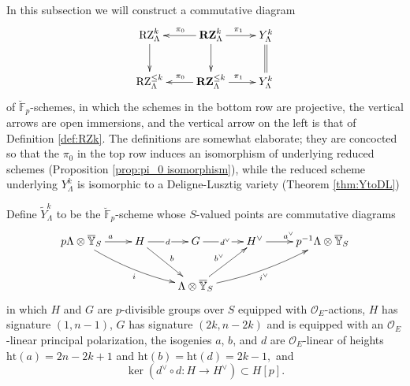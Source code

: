 \documentclass[11pt]{alggeom}
\newcommand{\F}{\mathbb F}
\newcommand{\co}{\mathcal O}
\begin{document}


In this subsection  we  will construct a commutative diagram 
\begin{equation}\label{augment diagram}
\xymatrix{
{ \mathrm{RZ}^ k_\Lambda }    \ar[d] & { \mathbf{RZ}^k_\Lambda } \ar[d]  \ar[l]_{\pi_0} \ar[r]^{\pi_1}   &  {  Y^k_\Lambda }  \ar@{=}[d] \\
{ \mathrm{RZ}^{\le k}_\Lambda }    & { \mathbf{RZ}^{\le k}_\Lambda } \ar[l]_{\pi_0} \ar[r]^{\pi_1}   &  {  Y^k_\Lambda } 
}
\end{equation}
of  $\breve{\F}_p$-schemes, in which the schemes in the bottom row are projective,  the vertical arrows are open immersions, and the vertical arrow on the left is that of Definition \ref{def:RZk}.
The definitions are somewhat elaborate;   they are concocted so that  the $\pi_0$ in the top row induces an isomorphism of underlying reduced schemes (Proposition \ref{prop:pi_0 isomorphism}),  while the reduced scheme underlying $Y_\Lambda^k$ is isomorphic to a Deligne-Lusztig variety (Theorem \ref{thm:YtoDL})





Define $\widetilde{Y}_\Lambda^{k}$ to be the $\breve{\F}_p$-scheme whose $S$-valued points are  commutative diagrams
\begin{equation}\label{Y tilde functor}
\xymatrix{
{p\Lambda \otimes \overline{\mathbb{Y}}_S  }\ar[r]^a    \ar@/_/[drr]_i  &  { H }  \ar[dr]^b  \ar[r]|{\, d\, }  &  {G}  \ar[r] | {\, d^\vee\, } & {H^\vee}  \ar[r]^{a^\vee}  & {p^{-1}\Lambda \otimes  \overline{\mathbb{Y}}_S  } \\
& &  { \Lambda \otimes  \overline{\mathbb{Y} }_S } \ar[ur]^{b^\vee} \ar@/_/[urr]_{i^\vee}
}
\end{equation}
in which $H$ and $G$ are $p$-divisible groups  over $S$  equipped  with  $\co_E$-actions, 
$H$ has  signature $(1,n-1)$, $G$ has signature $(2k, n-2k)$ and is equipped with an $\co_E$-linear principal polarization, 
the  isogenies   $a$, $b$, and $d$  are $\co_E$-linear  of heights  $\mathrm{ht}(a)=2n-2k+1$ and 
$
\mathrm{ht}(b) = \mathrm{ht}(d) =2k-1,
$
and 
\begin{equation}\label{Hpol}
\ker(  d^\vee \circ d : H \to H^\vee ) \subset H[p].
\end{equation}
\end{document}
